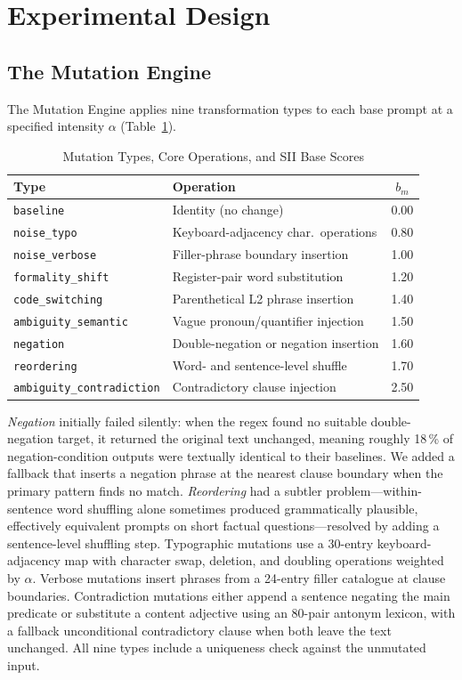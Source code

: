 \documentclass[conference]{IEEEtran}
\begin{document}
\section{Experimental Design}
\label{sec:methods}
\subsection{The Mutation Engine}
The Mutation Engine applies nine transformation types to each base
prompt at a specified intensity $\alpha$ (Table~\ref{tab:mutations}).
\begin{table}[t]
\caption{Mutation Types, Core Operations, and SII Base Scores}
\label{tab:mutations}
\centering
\setlength{\tabcolsep}{3.5pt}
\begin{tabular}{@{}llc@{}}
\toprule
\textbf{Type} & \textbf{Operation} & $b_m$ \\
\midrule
\texttt{baseline}                  & Identity (no change)                   & 0.00 \\
\texttt{noise\_typo}               & Keyboard-adjacency char.\ operations   & 0.80 \\
\texttt{noise\_verbose}            & Filler-phrase boundary insertion       & 1.00 \\
\texttt{formality\_shift}          & Register-pair word substitution        & 1.20 \\
\texttt{code\_switching}           & Parenthetical L2 phrase insertion      & 1.40 \\
\texttt{ambiguity\_semantic}       & Vague pronoun/quantifier injection     & 1.50 \\
\texttt{negation}                  & Double-negation or negation insertion  & 1.60 \\
\texttt{reordering}                & Word- and sentence-level shuffle       & 1.70 \\
\texttt{ambiguity\_contradiction}  & Contradictory clause injection         & 2.50 \\
\bottomrule
\end{tabular}
\end{table}
\textit{Negation} initially failed silently: when the regex found no
suitable double-negation target, it returned the original text
unchanged, meaning roughly 18\,\% of negation-condition outputs were
textually identical to their baselines. We added a fallback that
inserts a negation phrase at the nearest clause boundary when the
primary pattern finds no match. \textit{Reordering} had a subtler
problem---within-sentence word shuffling alone sometimes produced
grammatically plausible, effectively equivalent prompts on short
factual questions---resolved by adding a sentence-level shuffling
step.
Typographic mutations use a 30-entry keyboard-adjacency map with
character swap, deletion, and doubling operations weighted by $\alpha$.
Verbose mutations insert phrases from a 24-entry filler catalogue at
clause boundaries. Contradiction mutations either append a sentence
negating the main predicate or substitute a content adjective using an
80-pair antonym lexicon, with a fallback unconditional contradictory
clause when both leave the text unchanged. All nine types include a
uniqueness check against the unmutated input.
\end{document}
